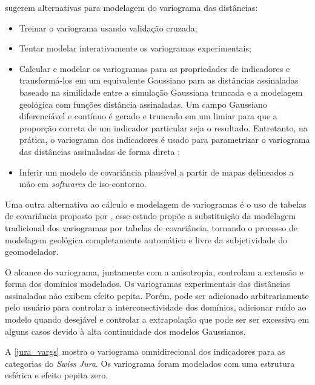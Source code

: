  sugerem alternativas para modelagem do variograma das distâncias:

\begin{itemize}
    \item Treinar o variograma usando validação cruzada;
    \item Tentar modelar interativamente os variogramas experimentais;
    \item Calcular e modelar os variogramas para as propriedades de indicadores e transformá-los em um equivalente Gaussiano para as distâncias assinaladas baseado na similidade entre a simulação Gaussiana truncada e a modelagem geológica com funções distância assinaladas. Um campo Gaussiano diferenciável e contínuo é gerado e truncado em um limiar para que a proporção correta de um indicador particular seja o resultado. Entretanto, na prática, o variograma dos indicadores é usado para parametrizar o variograma das distâncias assinaladas de forma direta \cite{martin2017implicitmodeling};
    \item Inferir um modelo de covariância plausível a partir de mapas delineados a mão em \textit{softwares} de iso-contorno.
\end{itemize}

Uma outra alternativa ao cálculo e modelagem de variogramas é o uso de tabelas de covariância proposto por , esse estudo propõe a substituição da modelagem tradicional dos variogramas por tabelas de covariância, tornando o processo de modelagem geológica completamente automático e livre da subjetividade do geomodelador.

O alcance do variograma, juntamente com a anisotropia, controlam a extensão e forma dos domínios modelados. Os variogramas experimentais das distâncias assinaladas não exibem efeito pepita. Porém, pode ser adicionado arbitrariamente pelo usuário para controlar a interconectividade dos domínios, adicionar ruído ao modelo quando desejável e controlar a extrapolação que pode ser ser excessiva em alguns casos devido à alta continuidade dos modelos Gaussianos.

A \autoref{jura_vargs} mostra o variograma omnidirecional dos indicadores para as categorias do \textit{Swiss Jura}. Os variograma foram modelados com uma estrutura esférica e efeito pepita zero.

